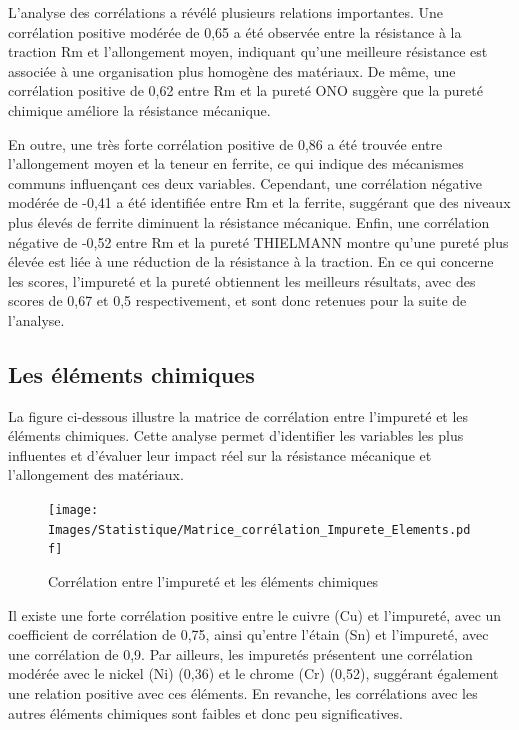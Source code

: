 \documentclass[12pt]{article}
\begin{document}
L'analyse des corrélations a révélé plusieurs relations importantes. 
Une corrélation positive modérée de 0,65 a été observée entre la résistance
à la traction Rm et l'allongement moyen, indiquant qu'une meilleure 
résistance est associée à une organisation plus homogène des matériaux. 
De même, une corrélation positive de 0,62 entre Rm et la pureté ONO 
suggère que la pureté chimique améliore la résistance mécanique.

En outre, une très forte corrélation positive de 0,86 a été trouvée entre 
l'allongement moyen et la teneur en ferrite, ce qui indique des mécanismes 
communs influençant ces deux variables. Cependant, une corrélation 
négative modérée de -0,41 a été identifiée entre Rm et la ferrite, 
suggérant que des niveaux plus élevés de ferrite diminuent la résistance 
mécanique. Enfin, une corrélation négative de -0,52 entre Rm et la pureté 
THIELMANN montre qu'une pureté plus élevée est liée à une réduction de 
la résistance à la traction. En ce qui concerne les scores, l'impureté 
et la pureté obtiennent les meilleurs résultats, avec des scores de 0,67 
et 0,5 respectivement, et sont donc retenues pour la suite de l'analyse.


\subsection{Les éléments chimiques}



La figure ci-dessous illustre la matrice de corrélation entre l'impureté 
et les éléments chimiques. Cette analyse permet d'identifier les 
variables les plus influentes et d'évaluer leur impact réel sur 
la résistance mécanique et l'allongement des matériaux.




\begin{figure}[H]
    \texttt{[image: Images/Statistique/Matrice\_corrélation\_Impurete\_Elements.pdf]} 
    \caption{Corrélation entre l'impureté et les éléments chimiques}
    \label{fig:Corrélation2}
\end{figure}


Il existe une forte corrélation positive entre le cuivre (Cu) et 
l'impureté, avec un coefficient de corrélation de 0,75, ainsi 
qu'entre l'étain (Sn) et l'impureté, avec une corrélation de 0,9. 
Par ailleurs, les impuretés présentent une corrélation modérée avec le 
nickel (Ni) (0,36) et le chrome (Cr) (0,52), suggérant également une 
relation positive avec ces éléments. En revanche, les corrélations avec 
les autres éléments chimiques sont faibles et donc peu significatives.
\end{document}
